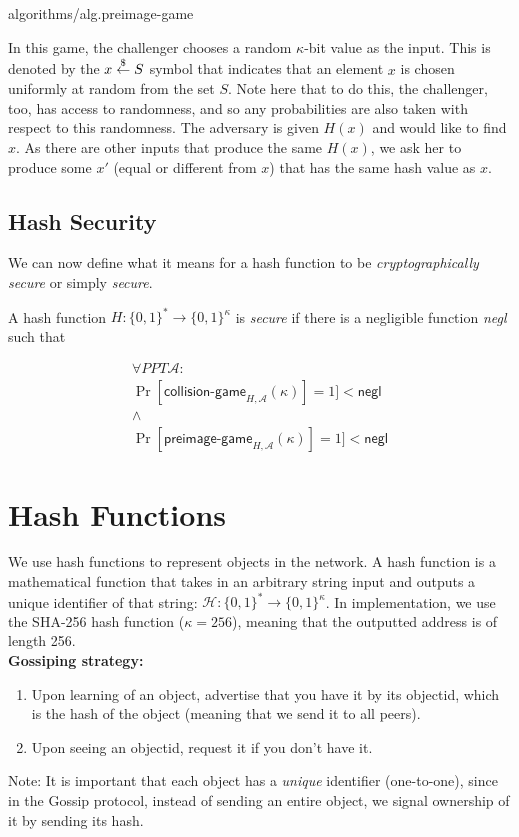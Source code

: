 {algorithms/alg.preimage-game}

In this game, the challenger chooses a random $\kappa$-bit value as the input. This is denoted by
the $x \overset{\$}{\gets} S$ symbol that indicates that an element $x$ is chosen uniformly at random
from the set $S$. Note here that to do this, the challenger, too, has access to randomness,
and so any probabilities are also taken with respect to this randomness.
The adversary is given $H(x)$ and would like to find $x$.
As there are other inputs that produce the same $H(x)$,
we ask her to produce some $x'$ (equal or different from $x$) that has the same hash value
as $x$.

\subsection*{Hash Security}

We can now define what it means for a hash function to be \emph{cryptographically secure}
or simply \emph{secure}.

\begin{definition}
  A hash function $H: \{0, 1\}^* \longrightarrow \{0, 1\}^\kappa$ is \emph{secure}
  if there is a negligible function \emph{negl} such that

  \begin{gather*}
    \forall PPT \mathcal{A}:\\
      \Pr[\textsf{collision-game}_{H,\mathcal{A}}(\kappa)] = 1] < \textsf{negl}
      \\\land\\
      \Pr[\textsf{preimage-game}_{H,\mathcal{A}}(\kappa)] = 1] < \textsf{negl}
  \end{gather*}
\end{definition}

\section{Hash Functions}
\quad We use hash functions to represent objects in the network. A hash function is a mathematical function that takes in an arbitrary string input and outputs a unique identifier of that string: $\mathcal{H}: \{0,1\}^* \rightarrow \{0,1\}^\kappa$.
In implementation, we use the SHA-256 hash function ($\kappa = 256$), meaning that the outputted address is of length 256. \\

\textbf{Gossiping strategy: }
\begin{enumerate}
    \item Upon learning of an object, advertise that you have it by its objectid, which is the hash of the object (meaning that we send it to all peers).
    \item Upon seeing an objectid, request it if you don't have it.
\end{enumerate}
Note: It is important that each object has a \textit{unique} identifier (one-to-one), since in the Gossip protocol, instead of sending an entire object, we signal ownership of it by sending its hash.\newline

